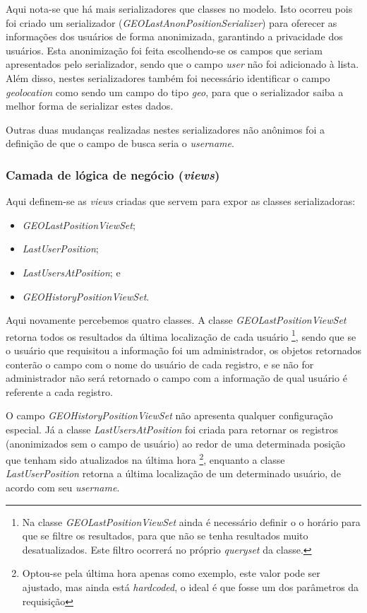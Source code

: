 Aqui nota-se que há mais serializadores que classes no modelo. Isto ocorreu pois foi criado um serializador (\textit{GEOLastAnonPositionSerializer}) para oferecer as informações dos usuários de forma anonimizada, garantindo a privacidade dos usuários. Esta anonimização foi feita escolhendo-se os campos que seriam apresentados pelo serializador, sendo que o campo \textit{user} não foi adicionado à lista. Além disso, nestes serializadores também foi necessário identificar o campo \textit{geolocation} como sendo um campo do tipo \textit{geo}, para que o serializador saiba a melhor forma de serializar estes dados.

Outras duas mudanças realizadas nestes serializadores não anônimos foi a definição de que o campo de busca seria o \textit{username}.

\subsubsection{Camada de lógica de negócio (\textit{views})}
Aqui definem-se as \textit{views} criadas que servem para expor as classes serializadoras: %
\begin{itemize}
    \item \textit{GEOLastPositionViewSet};
    \item \textit{LastUserPosition};
    \item \textit{LastUsersAtPosition}; e
    \item \textit{GEOHistoryPositionViewSet}.
\end{itemize}

Aqui novamente percebemos quatro classes. A classe \textit{GEOLastPositionViewSet} retorna todos os resultados da última localização de cada usuário%
\footnote{Na classe \textit{GEOLastPositionViewSet} ainda é necessário definir o o horário para que se filtre os resultados, para que não se tenha resultados muito desatualizados. Este filtro ocorrerá no próprio \textit{queryset} da classe.}, sendo que se o usuário que requisitou a informação foi um administrador, os objetos retornados conterão o campo com o nome do usuário de cada registro, e se não for administrador não será retornado o campo com a informação de qual usuário é referente a cada registro.

O campo \textit{GEOHistoryPositionViewSet} não apresenta qualquer configuração especial. Já a classe \textit{LastUsersAtPosition} foi criada para retornar os registros (anonimizados sem o campo de usuário) ao redor de uma determinada posição que tenham sido atualizados na última hora%
\footnote{Optou-se pela última hora apenas como exemplo, este valor pode ser ajustado, mas ainda está \textit{hardcoded}, o ideal é que fosse um dos parâmetros da requisição},
enquanto a classe \textit{LastUserPosition} retorna a última localização de um determinado usuário, de acordo com seu \textit{username}.

